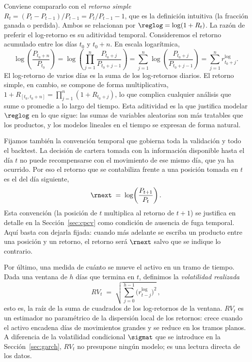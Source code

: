 Conviene compararlo con el \emph{retorno simple} $R_t = (P_t - P_{t-1})/P_{t-1} = P_t/P_{t-1} - 1$, que es la definición intuitiva (la fracción ganada o perdida). Ambos se relacionan por $\reglog = \log(1 + R_t)$. La razón de preferir el log-retorno es su aditividad temporal. Consideremos el retorno acumulado entre los días $t_0$ y $t_0 + n$. En escala logarítmica,
\[
\log\!\left(\frac{P_{t_0+n}}{P_{t_0}}\right)
= \log\!\left(\prod_{j=1}^{n} \frac{P_{t_0+j}}{P_{t_0+j-1}}\right)
= \sum_{j=1}^{n} \log\!\left(\frac{P_{t_0+j}}{P_{t_0+j-1}}\right)
= \sum_{j=1}^{n} r^{\log}_{t_0+j}.
\]
El log-retorno de varios días es la suma de los log-retornos diarios. El retorno simple, en cambio, se compone de forma multiplicativa, $1 + R_{[t_0, t_0+n]} = \prod_{j=1}^{n}(1 + R_{t_0+j})$, lo que complica cualquier análisis que sume o promedie a lo largo del tiempo. Esta aditividad es la que justifica modelar $\reglog$ en lo que sigue: las sumas de variables aleatorias son más tratables que los productos, y los modelos lineales en el tiempo se expresan de forma natural.

Fijamos también la convención temporal que gobierna toda la validación y todo el backtest. La decisión de cartera tomada con la información disponible hasta el día $t$ no puede recompensarse con el movimiento de ese mismo día, que ya ha ocurrido. Por eso el retorno que se contabiliza frente a una posición tomada en $t$ es el del día siguiente,
\[
\rnext \;=\; \log\!\left(\frac{P_{t+1}}{P_t}\right).
\]
Esta convención (la posición de $t$ multiplica al retorno de $t+1$) se justifica en detalle en la Sección~\ref{sec:cpcv} como condición de ausencia de fuga temporal. Aquí basta con dejarla fijada: cuando más adelante se escriba un producto entre una posición y un retorno, el retorno será $\rnext$ salvo que se indique lo contrario.

Por último, una medida de cuánto se mueve el activo en un tramo de tiempo. Dada una ventana de $h$ días que termina en $t$, definimos la \emph{volatilidad realizada}
\[
RV_t \;=\; \sqrt{\sum_{j=0}^{h-1} \big(r^{\log}_{t-j}\big)^2}\,,
\]
esto es, la raíz de la suma de cuadrados de los log-retornos de la ventana. $RV_t$ es un estimador no paramétrico de la dispersión local de los retornos: crece cuando el activo encadena días de movimientos grandes y se reduce en los tramos planos. A diferencia de la volatilidad condicional $\sigmat$ que se introduce en la Sección~\ref{sec:garch}, $RV_t$ no presupone ningún modelo; es una lectura directa de los datos.

